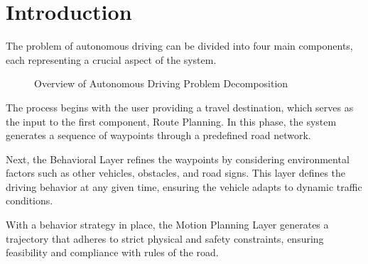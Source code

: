 \section{Introduction} \label{sec:introduction}

The problem of autonomous driving can be divided into four main components, each representing a crucial aspect of the system.

\begin{figure}[h!]
	\centering
	\caption{Overview of Autonomous Driving Problem Decomposition}
	\label{fig:autonomous_driving_overview}
\end{figure}

The process begins with the user providing a travel destination, which serves as the input to the first component, Route Planning.
In this phase, the system generates a sequence of waypoints through a predefined road network.

Next, the Behavioral Layer refines the waypoints by considering environmental factors such as other vehicles, obstacles, and road signs.
This layer defines the driving behavior at any given time, ensuring the vehicle adapts to dynamic traffic conditions.

With a behavior strategy in place, the Motion Planning Layer generates a trajectory that adheres to strict physical and safety constraints, ensuring
feasibility and compliance with rules of the road.

